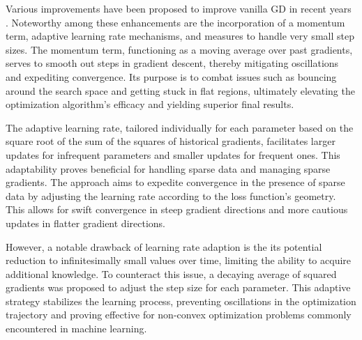 Various improvements have been proposed to improve vanilla GD in recent years \cite{Ruder2016overviewgradientdescent,Tian2023RecentAdvancesStochastic}. Noteworthy among these enhancements are the incorporation of a momentum term, adaptive learning rate mechanisms, and measures to handle very small step sizes. The momentum term, functioning as a moving average over past gradients, serves to smooth out steps in gradient descent, thereby mitigating oscillations and expediting convergence. Its purpose is to combat issues such as bouncing around the search space and getting stuck in flat regions, ultimately elevating the optimization algorithm's efficacy and yielding superior final results.

The adaptive learning rate, tailored individually for each parameter based on the square root of the sum of the squares of historical gradients, facilitates larger updates for infrequent parameters and smaller updates for frequent ones. This adaptability proves beneficial for handling sparse data and managing sparse gradients. The approach aims to expedite convergence in the presence of sparse data by adjusting the learning rate according to the loss function's geometry. This allows for swift convergence in steep gradient directions and more cautious updates in flatter gradient directions.

However, a notable drawback of learning rate adaption is the its potential reduction to infinitesimally small values over time, limiting the ability to acquire additional knowledge. To counteract this issue, a decaying average of squared gradients was proposed to adjust the step size for each parameter. This adaptive strategy stabilizes the learning process, preventing oscillations in the optimization trajectory and proving effective for non-convex optimization problems commonly encountered in machine learning.


